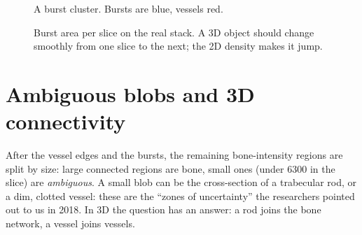 \begin{figure}[ht]
\centering
{}\hfill
{}\hfill
{}\hfill
{}
\caption{A burst cluster. Bursts are blue, vessels red.}
\label{fig:bursts}
\end{figure}

\begin{figure}[ht]
\centering
{}
\caption{Burst area per slice on the real stack. A 3D object should change smoothly from one slice to
  the next; the 2D density makes it jump.}
\label{fig:bursts-z}
\end{figure}

\section{Ambiguous blobs and 3D connectivity}
\label{sec:refinement}

After the vessel edges and the bursts, the remaining bone-intensity regions are split by size: large
connected regions are bone, small ones (under 6300\umsq{} in the slice) are \emph{ambiguous}. A small
blob can be the cross-section of a trabecular rod, or a dim, clotted vessel: these are the ``zones of
uncertainty'' the researchers pointed out to us in 2018. In 3D the question has an answer: a rod joins the bone network, a
vessel joins vessels.

